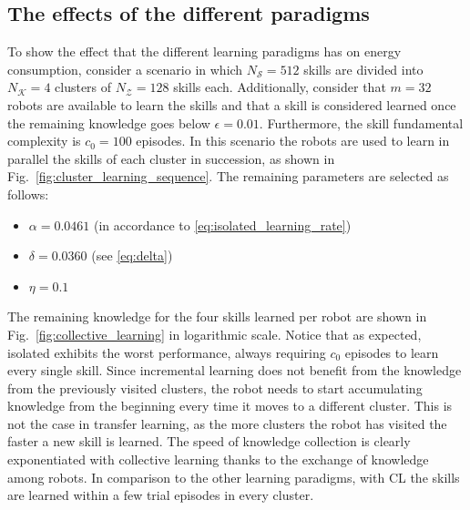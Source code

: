 \subsection{The effects of the different paradigms}
To show the effect that the different learning paradigms has on energy consumption, consider a scenario in which $N_\mathcal{S}= 512$  skills are divided into $N_\mathcal{K}=4$ clusters of $N_\mathcal{Z} = 128$ skills each. Additionally, consider that $m=32$ robots are available to learn the skills and that a skill is considered learned once the remaining knowledge goes below $\epsilon = 0.01$. Furthermore, the skill fundamental complexity is $c_0=100$ episodes. In this scenario the robots are used to learn in parallel the skills of each cluster in succession, as shown in Fig.~\ref{fig:cluster_learning_sequence}. The remaining parameters are selected as follows:
\begin{itemize}
	\item $\alpha =  0.0461$ (in accordance to \eqref{eq:isolated_learning_rate})
	\item $\delta =  0.0360$ (see \eqref{eq:delta})
	\item $\eta= 0.1$
\end{itemize} 
The remaining knowledge for the four skills learned per robot are shown in Fig.~\ref{fig:collective_learning} in logarithmic scale. Notice that as expected, isolated exhibits the worst performance, always requiring $c_0$ episodes to learn every single skill. Since incremental learning does not benefit from the knowledge from the previously visited clusters, the robot needs to start accumulating knowledge from the beginning every time it moves to a different cluster. This is not the case in transfer learning, as the more clusters the robot has visited the faster a new skill is learned. The speed of knowledge collection is clearly exponentiated with collective learning thanks to the exchange of knowledge among robots. In comparison to the other learning paradigms, with CL the skills are learned within a few trial episodes in every cluster. 

